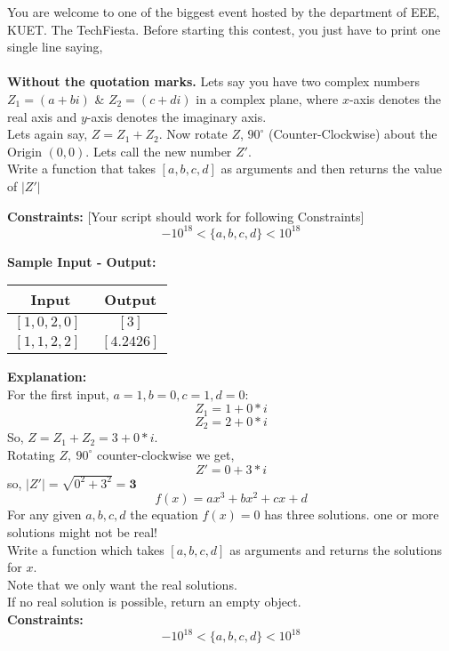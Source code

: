 \documentclass[12pt,paper=a4,answers]{exam}
\begin{document}
\begin{questions}

\pointsinrightmargin
\pointsdroppedatright
\marksnotpoints
\pointformat{\boldmath\themarginpoints}
\bracketedpoints
\question[10]
\label{Q:zbus}
You are welcome to one of the biggest event hosted by the department of EEE, KUET. The TechFiesta. Before starting this contest, you just have to print one single line saying,\\ {} \\ {\bfseries Without the quotation marks.}
\droppoints
\question[10]
\label{Q:zbus}
Lets say you have two complex numbers $Z_1 = (a + bi)$ \& $Z_2 = (c + di)$ in a complex plane, where $x$-axis denotes the real axis and $y$-axis denotes the imaginary axis.\\
Lets again say, $Z = Z_1 + Z_2$. Now rotate $Z$, $90^{\circ}$ (Counter-Clockwise) about the Origin $(0,0)$. Lets call the new number $Z'$.
\\Write a function that takes $[a, b, c, d]$ as arguments and then returns the value of $|Z'|$

\textbf{ Constraints:} [{\footnotesize Your script should work for following Constraints}]
$$ -10^{18} < \{ a, b, c, d \} < 10^{18}$$

\textbf{ Sample Input - Output:}
\begin{center}
\begin{tabular}{|c|c|}
\hline
\textbf{Input} & \textbf{Output}\\
\hline
$[1, 0, 2, 0]\ \ $ & $[3]$ \\
$[1, 1, 2, 2]\ \ $ & $[4.2426]$ \\
\hline
\end{tabular}
\end{center}

\textbf{Explanation:} \\
For the first input, $a = 1, b = 0, c = 1, d = 0$:$$Z_1 = 1 + 0*i$$ $$Z_2 = 2 + 0*i$$
So, $Z = Z_1 + Z_2 = 3 + 0*i$. \\Rotating $Z,\  90^{\circ}$ counter-clockwise we get, $$Z' = 0 + 3*i$$
so, $|Z'| = \sqrt{0^2 + 3^2} = \textbf {3}$
\\

\droppoints
\question[10]
\label{Q:zbus}
$$f(x) = ax^3 + bx^2 + cx + d$$
For any given $a, b, c, d$ the equation $f(x) = 0$ has three solutions. one or more solutions might not be real!\\
Write a function which takes $[a,b,c,d]$ as arguments and returns the solutions for $x$.\\
Note that we only want the real solutions.
\\If no real solution is possible, return an empty object.\\
\textbf{ Constraints:} 
$$ -10^{18} < \{ a, b, c, d \} < 10^{18}$$


\end{questions}
\end{document}

